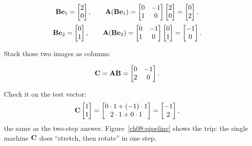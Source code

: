 \[
\mathbf{B}\mathbf{e}_1 = \begin{bmatrix}2 \\ 0\end{bmatrix},\qquad
\mathbf{A}(\mathbf{B}\mathbf{e}_1) = \begin{bmatrix} 0 & -1 \\ 1 & 0 \end{bmatrix}\begin{bmatrix}2\\0\end{bmatrix}
= \begin{bmatrix}0 \\ 2\end{bmatrix}.
\]
\[
\mathbf{B}\mathbf{e}_2 = \begin{bmatrix}0 \\ 1\end{bmatrix},\qquad
\mathbf{A}(\mathbf{B}\mathbf{e}_2) = \begin{bmatrix} 0 & -1 \\ 1 & 0 \end{bmatrix}\begin{bmatrix}0\\1\end{bmatrix}
= \begin{bmatrix}-1 \\ 0\end{bmatrix}.
\]

Stack those two images as columns:

\[
\mathbf{C} = \mathbf{A}\mathbf{B} = \begin{bmatrix} 0 & -1 \\ 2 & 0 \end{bmatrix}.
\]

Check it on the test vector:
\[
\mathbf{C}\begin{bmatrix}1\\1\end{bmatrix} = \begin{bmatrix}0\cdot1 + (-1)\cdot1 \\ 2\cdot1 + 0\cdot1\end{bmatrix} = \begin{bmatrix}-1 \\ 2\end{bmatrix},
\]
the same as the two-step answer. Figure~\ref{ch08:pipeline} shows the trip: the single
machine $\mathbf{C}$ does ``stretch, then rotate'' in one step.

